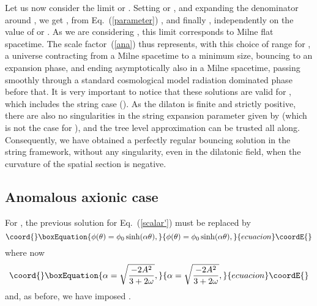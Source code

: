 \documentclass[a4paper,aps,twocolumn,prd,showpacs,nofootinbib]{revtex4}
\begin{document}
Let us now consider the limit \coordHE{} or
\coordHE{}. Setting \coordHE{} or \coordHE{}, and expanding the denominator around \coordHE{},
we get \coordHE{}, from Eq.~(\ref{parameter})
\coordHE{}, and finally \coordHE{},
independently on the value of \coordHE{} or \myHighlight{$\omega$}\coordHE{}.  As we are considering
\coordHE{}, this limit corresponds to Milne flat spacetime. The scale
factor~(\ref{ana}) thus represents, with this choice of range for
\myHighlight{$\theta$}\coordHE{}, a universe contracting from a Milne spacetime to a minimum
size, bouncing to an expansion phase, and ending asymptotically also
in a Milne spacetime, passing smoothly through a standard cosmological
model radiation dominated phase before that.  It is very important to
notice that these solutions are valid for \coordHE{}, which
includes the string case (\coordHE{}). As the dilaton is finite and
strictly positive, there are also no singularities in the string
expansion parameter given by \coordHE{} (which is not the
case for \coordHE{}), and the tree level approximation can be trusted all
along.  Consequently, we have obtained a perfectly regular bouncing
solution in the string framework, without any singularity, even in the
dilatonic field, when the curvature of the spatial section is
negative.

\subsection{Anomalous axionic case}

For \coordHE{}, the previous solution for Eq.~(\ref{scalar'})
must be replaced by
\begin{equation}\coord{}\boxEquation{
\phi(\theta) = \phi_0\sinh (\alpha\theta),\label{phiAA}
}{
\phi(\theta) = \phi_0\sinh (\alpha\theta),}{ecuacion}\coordE{}\end{equation}
where now
\begin{equation}\coord{}\boxEquation{
\alpha = \sqrt{\frac{-2A^2}{3 + 2\omega}},
}{
\alpha = \sqrt{\frac{-2A^2}{3 + 2\omega}},
}{ecuacion}\coordE{}\end{equation}
and, as before, we have imposed \coordHE{}.
\end{document}
